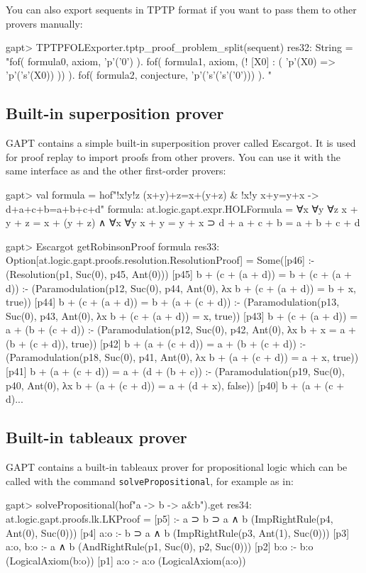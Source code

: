 \documentclass[a4paper,11pt]{article}
\newcommand{\cli}[1]{{\ttfamily {#1}}}
\begin{document}
You can also export sequents in TPTP format if you want to pass them to other
provers manually:
\begin{clilisting}
gapt> TPTPFOLExporter.tptp_proof_problem_split(sequent)
res32: String =
"fof( formula0, axiom, 'p'('0') ).
fof( formula1, axiom, (! [X0] : ( 'p'(X0) => 'p'('s'(X0)) )) ).
fof( formula2, conjecture, 'p'('s'('s'('0'))) ).
"

\end{clilisting}

\subsection{Built-in superposition prover}

GAPT contains a simple built-in superposition prover called Escargot.  It is
used for proof replay to import proofs from other provers.  You can use it with
the same interface as \cli{Prover9} and the other first-order provers:

\begin{clilisting}
gapt> val formula = hof"!x!y!z (x+y)+z=x+(y+z) & !x!y x+y=y+x -> d+a+c+b=a+b+c+d"
formula: at.logic.gapt.expr.HOLFormula =
∀x ∀y ∀z x + y + z = x + (y + z) ∧ ∀x ∀y x + y = y + x ⊃
  d + a + c + b = a + b + c + d

gapt> Escargot getRobinsonProof formula
res33: Option[at.logic.gapt.proofs.resolution.ResolutionProof] =
Some([p46]  :-     (Resolution(p1, Suc(0), p45, Ant(0)))
[p45] b + (c + (a + d)) = b + (c + (a + d)) :-     (Paramodulation(p12, Suc(0), p44, Ant(0), λx b + (c + (a + d)) = b + x, true))
[p44] b + (c + (a + d)) = b + (a + (c + d)) :-     (Paramodulation(p13, Suc(0), p43, Ant(0), λx b + (c + (a + d)) = x, true))
[p43] b + (c + (a + d)) = a + (b + (c + d)) :-     (Paramodulation(p12, Suc(0), p42, Ant(0), λx b + x = a + (b + (c + d)), true))
[p42] b + (a + (c + d)) = a + (b + (c + d)) :-     (Paramodulation(p18, Suc(0), p41, Ant(0), λx b + (a + (c + d)) = a + x, true))
[p41] b + (a + (c + d)) = a + (d + (b + c)) :-     (Paramodulation(p19, Suc(0), p40, Ant(0), λx b + (a + (c + d)) = a + (d + x), false))
[p40] b + (a + (c + d)...
\end{clilisting}

\subsection{Built-in tableaux prover}

GAPT contains a  built-in tableaux prover for propositional logic
which can be called with the command \texttt{solvePropositional}, for example as in:
\begin{clilisting}
gapt> solvePropositional(hof"a -> b -> a&b").get
res34: at.logic.gapt.proofs.lk.LKProof =
[p5]  :- a ⊃ b ⊃ a ∧ b    (ImpRightRule(p4, Ant(0), Suc(0)))
[p4] a:o :- b ⊃ a ∧ b    (ImpRightRule(p3, Ant(1), Suc(0)))
[p3] a:o, b:o :- a ∧ b    (AndRightRule(p1, Suc(0), p2, Suc(0)))
[p2] b:o :- b:o    (LogicalAxiom(b:o))
[p1] a:o :- a:o    (LogicalAxiom(a:o))

\end{clilisting}
\end{document}
